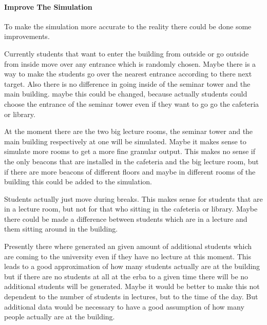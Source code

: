 \paragraph{Improve The Simulation }

To make the simulation more accurate to the reality there could be done some improvements. 

\par Currently students that want to enter the building from outside or go outside from inside move over any entrance which is randomly chosen. Maybe there is a way to make the students go over the nearest entrance according to there next target. Also there is no difference in going inside of the seminar tower and the main building. maybe this could be changed, because actually students could choose the entrance of the seminar tower even if they want to go go the cafeteria or library.

\par At the moment there are the two big lecture rooms, the seminar tower and the main building respectively at one will be simulated. Maybe it makes sense to simulate more rooms to get a more fine granular output. This makes no sense if the only beacons that are installed in the cafeteria and the big lecture room, but if there are more beacons of different floors and maybe in different rooms of the building this could be added to the simulation.

\par Students actually just move during breaks. This makes sense for students that are in a lecture room, but not for that who sitting in the cafeteria or library. Maybe there could be made a difference between students which are in a lecture and them sitting around in the building.

\par Presently there where generated an given amount of additional students which are coming to the university even if they have no lecture at this moment. This leads to a good approximation of how many students actually are at the building but if there are no students at all at the erba to a given time there will be no additional students will be generated. Maybe it would be better to make this not dependent to the number of students in lectures, but to the time of the day. But additional data would be necessary to have a good assumption of how many people actually are at the building.